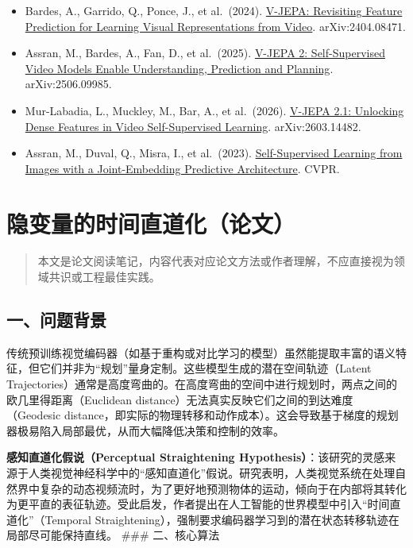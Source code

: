 \begin{itemize}
\tightlist
\item
  Bardes, A., Garrido, Q., Ponce, J., et al.~(2024). \href{https://arxiv.org/abs/2404.08471}{V-JEPA: Revisiting Feature Prediction for Learning Visual Representations from Video}. arXiv:2404.08471.
\item
  Assran, M., Bardes, A., Fan, D., et al.~(2025). \href{https://arxiv.org/abs/2506.09985}{V-JEPA 2: Self-Supervised Video Models Enable Understanding, Prediction and Planning}. arXiv:2506.09985.
\item
  Mur-Labadia, L., Muckley, M., Bar, A., et al.~(2026). \href{https://arxiv.org/abs/2603.14482}{V-JEPA 2.1: Unlocking Dense Features in Video Self-Supervised Learning}. arXiv:2603.14482.
\item
  Assran, M., Duval, Q., Misra, I., et al.~(2023). \href{https://arxiv.org/abs/2301.08243}{Self-Supervised Learning from Images with a Joint-Embedding Predictive Architecture}. CVPR.
\end{itemize}

\clearpage

\hypertarget{ux9690ux53d8ux91cfux7684ux65f6ux95f4ux76f4ux9053ux5316ux8bbaux6587}{%
\section{隐变量的时间直道化（论文）}\label{ux9690ux53d8ux91cfux7684ux65f6ux95f4ux76f4ux9053ux5316ux8bbaux6587}}

\begin{quote}
本文是论文阅读笔记，内容代表对应论文方法或作者理解，不应直接视为领域共识或工程最佳实践。
\end{quote}

\hypertarget{ux4e00ux95eeux9898ux80ccux666f-12}{%
\subsection{一、问题背景}\label{ux4e00ux95eeux9898ux80ccux666f-12}}

传统预训练视觉编码器（如基于重构或对比学习的模型）虽然能提取丰富的语义特征，但它们并非为``规划''量身定制。这些模型生成的潜在空间轨迹（Latent Trajectories）通常是高度弯曲的。在高度弯曲的空间中进行规划时，两点之间的欧几里得距离（Euclidean distance）无法真实反映它们之间的到达难度（Geodesic distance，即实际的物理转移和动作成本）。这会导致基于梯度的规划器极易陷入局部最优，从而大幅降低决策和控制的效率。

\textbf{感知直道化假说（Perceptual Straightening Hypothesis）}：该研究的灵感来源于人类视觉神经科学中的``感知直道化''假说。研究表明，人类视觉系统在处理自然界中复杂的动态视频流时，为了更好地预测物体的运动，倾向于在内部将其转化为更平直的表征轨迹。受此启发，作者提出在人工智能的世界模型中引入``时间直道化''（Temporal Straightening），强制要求编码器学习到的潜在状态转移轨迹在局部尽可能保持直线。
\#\#\# 二、核心算法

